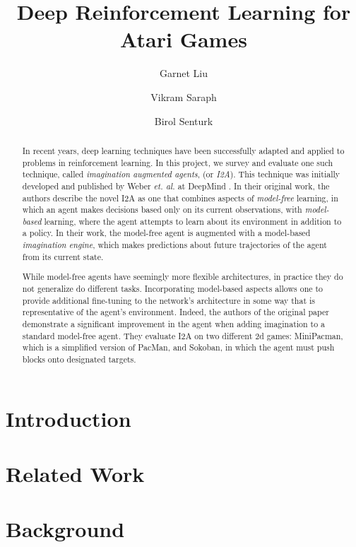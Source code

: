 \documentclass[10pt, twocolumn]{article}
\title{Deep Reinforcement Learning for Atari Games}
\author{Garnet Liu \and Vikram Saraph \and Birol Senturk}
\begin{document}
\maketitle

\begin{abstract}
In recent years, deep learning techniques have been successfully adapted and applied to problems
in reinforcement learning. In this project, we survey and evaluate one such technique, called \emph{imagination augmented agents},
(or \emph{I2A}). This technique was initially developed and published by Weber \emph{et. al.} at DeepMind \cite{}. In their original
work, the authors describe the novel I2A as one that combines aspects of \emph{model-free} learning, in which an agent makes decisions
based only on its current observations, with \emph{model-based} learning, where the agent attempts to learn about its environment
in addition to a policy. In their work, the model-free agent is augmented with a model-based \emph{imagination engine}, which
makes predictions about future trajectories of the agent from its current state.

While model-free agents have seemingly more flexible architectures, in practice they do not generalize do different tasks. Incorporating model-based aspects allows one to provide additional fine-tuning to the network's architecture in some way that is representative of the agent's environment. Indeed, the authors of the original paper demonstrate a significant improvement in the agent when adding imagination to a standard model-free agent. They evaluate I2A on two different 2d games: MiniPacman, which is a simplified version of PacMan, and Sokoban, in which the agent must push blocks onto designated targets. 



\end{abstract}

\section{Introduction}

\section{Related Work}

\section{Background}
\end{document}
